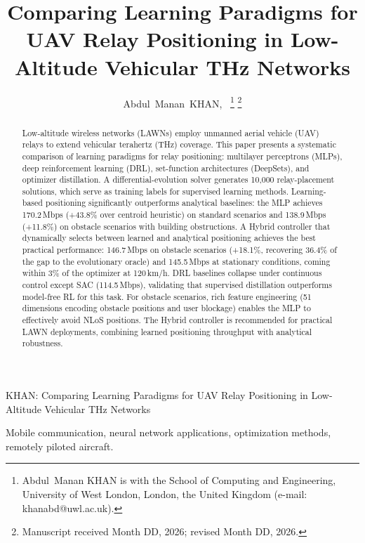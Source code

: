 \documentclass[journal]{IEEEtran}
\begin{document}
\title{Comparing Learning Paradigms for UAV Relay Positioning in Low-Altitude Vehicular THz Networks}

\author{Abdul~Manan~KHAN,~%
\thanks{Abdul~Manan KHAN is with the School of Computing and Engineering, University of West London, London, the United Kingdom (e-mail: khanabd@uwl.ac.uk).}%
\thanks{Manuscript received Month DD, 2026; revised Month DD, 2026.}}

%
{KHAN: Comparing Learning Paradigms for UAV Relay Positioning in Low-Altitude Vehicular THz Networks}

\maketitle

\begin{abstract}
Low-altitude wireless networks (LAWNs) employ unmanned aerial vehicle (UAV) relays to extend vehicular terahertz (THz) coverage. This paper presents a systematic comparison of learning paradigms for relay positioning: multilayer perceptrons (MLPs), deep reinforcement learning (DRL), set-function architectures (DeepSets), and optimizer distillation. A differential-evolution solver generates 10{,}000 relay-placement solutions, which serve as training labels for supervised learning methods. Learning-based positioning significantly outperforms analytical baselines: the MLP achieves 170.2\,Mbps (+43.8\% over centroid heuristic) on standard scenarios and 138.9\,Mbps (+11.8\%) on obstacle scenarios with building obstructions. A Hybrid controller that dynamically selects between learned and analytical positioning achieves the best practical performance: 146.7\,Mbps on obstacle scenarios (+18.1\%, recovering 36.4\% of the gap to the evolutionary oracle) and 145.5\,Mbps at stationary conditions, coming within 3\% of the optimizer at 120\,km/h. DRL baselines collapse under continuous control except SAC (114.5\,Mbps), validating that supervised distillation outperforms model-free RL for this task. For obstacle scenarios, rich feature engineering (51 dimensions encoding obstacle positions and user blockage) enables the MLP to effectively avoid NLoS positions. The Hybrid controller is recommended for practical LAWN deployments, combining learned positioning throughput with analytical robustness.
\end{abstract}

\begin{IEEEkeywords}
Mobile communication, neural network applications, optimization methods, remotely piloted aircraft.
\end{IEEEkeywords}
\end{document}
